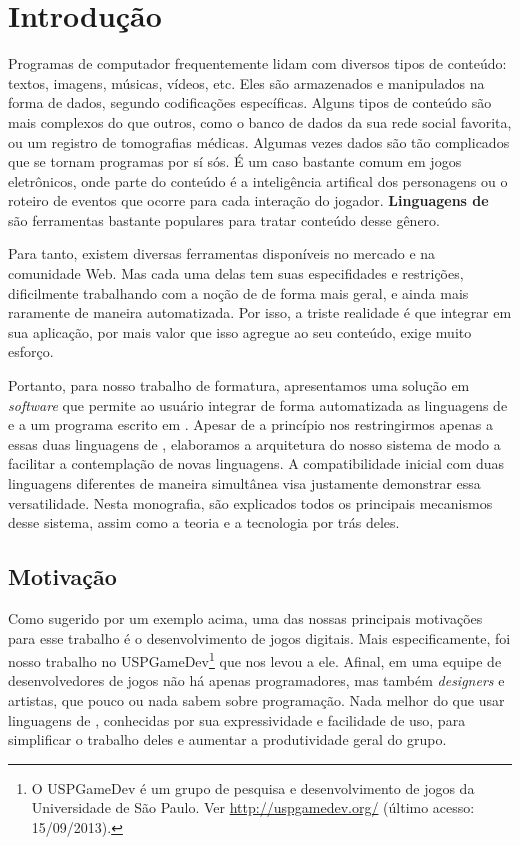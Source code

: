 
\chapter{Introdução}
\label{cap:intr}

Programas de computador frequentemente lidam com diversos tipos de conteúdo:
textos, imagens, músicas, vídeos, etc. Eles são armazenados e manipulados na
forma de dados, segundo codificações específicas. Alguns tipos de conteúdo são
mais complexos do que outros, como o banco de dados da sua rede social favorita,
ou um registro de tomografias médicas. Algumas vezes dados são tão
complicados que se tornam programas por sí sós. É um caso bastante comum em
jogos eletrônicos, onde parte do conteúdo é a inteligência artifical dos
personagens ou o roteiro de eventos que ocorre para cada interação do jogador.
\textbf{Linguagens de \script{}} são ferramentas bastante populares para tratar
conteúdo desse gênero.

Para tanto, existem diversas ferramentas disponíveis no mercado e na comunidade
Web. Mas cada uma delas tem suas especifidades e restrições, dificilmente
trabalhando com a noção de  de forma mais geral, e ainda mais
raramente de maneira automatizada. Por isso, a triste realidade é que integrar
 em sua aplicação, por mais valor que isso agregue ao seu conteúdo,
exige muito esforço.

Portanto, para nosso trabalho de formatura, apresentamos uma solução em
\textit{software} que permite ao usuário integrar de forma automatizada as
linguagens de \script{}  e  a um programa escrito em
\CXX{}. Apesar de a princípio nos restringirmos apenas a essas duas linguagens
de \script{}, elaboramos a arquitetura do nosso sistema de modo a facilitar
a contemplação de novas linguagens. A compatibilidade inicial com duas
linguagens diferentes de maneira simultânea visa justamente demonstrar essa
versatilidade. Nesta monografia, são explicados todos os principais mecanismos desse
sistema, assim como a teoria e a tecnologia por trás deles.

\section{Motivação}
\label{cap:intr:motivacao}

Como sugerido por um exemplo acima, uma das nossas principais
motivações para esse trabalho é o desenvolvimento de jogos digitais. Mais
especificamente, foi nosso trabalho no USPGameDev\footnote{O USPGameDev
  é um grupo de pesquisa e desenvolvimento de jogos da
  Universidade de São Paulo. Ver \url{http://uspgamedev.org/}
  (último acesso: 15/09/2013).
} que nos levou a ele. Afinal, em uma equipe de desenvolvedores de jogos não
há apenas programadores, mas também \textit{designers} e artistas, que pouco
ou nada sabem sobre programação. Nada melhor do que usar linguagens de
\script{}, conhecidas por sua expressividade e facilidade de uso, para
simplificar o trabalho deles e aumentar a produtividade geral do grupo.

